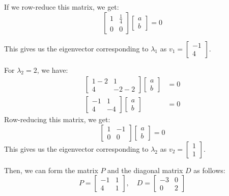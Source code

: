 {If we row-reduce this matrix, we get:
\begin{equation*}
\begin{bmatrix}
1 & \frac{1}{4} \\
0 & 0
\end{bmatrix}
\begin{bmatrix}
a \\
b
\end{bmatrix} =
0
\end{equation*}

This gives us the eigenvector corresponding to $\lambda_1$ as 
$v_1 = \begin{bmatrix}
-1 \\
4
\end{bmatrix}$.

For $\lambda_2 = 2$, we have:
\begin{align*}
\begin{bmatrix}
1 - 2 & 1 \\
4 & -2 - 2
\end{bmatrix}
\begin{bmatrix}
a \\
b
\end{bmatrix} &=
0 \\
\begin{bmatrix}
-1 & 1 \\
4 & -4
\end{bmatrix}
\begin{bmatrix}
a \\
b
\end{bmatrix} &=
0
\end{align*}
Row-reducing this matrix, we get:
\begin{equation*}
\begin{bmatrix}
1 & -1 \\
0 & 0
\end{bmatrix}
\begin{bmatrix}
a \\
b
\end{bmatrix} =
0
\end{equation*}
This gives us the eigenvector corresponding to $\lambda_2$ as
$v_2 = \begin{bmatrix}
1 \\
1
\end{bmatrix}$.

Then, we can form the matrix $P$ and the diagonal matrix $D$ as follows:
\begin{equation*}
P = \begin{bmatrix}
-1 & 1 \\
4 & 1
\end{bmatrix}, \quad D = \begin{bmatrix}
-3 & 0 \\
0 & 2
\end{bmatrix}
\end{equation*}

}

